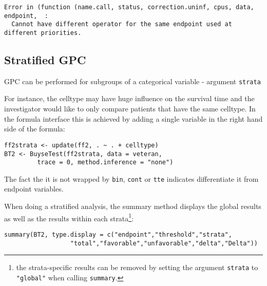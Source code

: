 \documentclass[12pt]{article}
\begin{document}
\begin{verbatim}
Error in (function (name.call, status, correction.uninf, cpus, data, endpoint,  : 
  Cannot have different operator for the same endpoint used at different priorities.
\end{verbatim}

\subsection{Stratified GPC}
\label{sec:org60483c4}

GPC can be performed for subgroups of a categorical variable \hfill -
argument \texttt{strata}

\bigskip

 For instance, the celltype may have huge influence on the survival
time and the investigator would like to only compare patients that
have the same celltype. In the formula interface this is achieved by
adding a single variable in the right hand side of the formula:
\lstset{language=r,label= ,caption= ,captionpos=b,numbers=none}
\begin{lstlisting}
ff2strata <- update(ff2, . ~ . + celltype)
BT2 <- BuyseTest(ff2strata, data = veteran, 
		 trace = 0, method.inference = "none")
\end{lstlisting}

The fact the it is not wrapped by \texttt{bin}, \texttt{cont} or \texttt{tte} indicates
differentiate it from endpoint variables. 

\clearpage

When doing a stratified analysis, the summary method displays the
global results as well as the results within each strata\footnote{the
strata-specific results can be removed by setting the argument
\texttt{strata} to \texttt{"global"} when calling \texttt{summary}.}:
\lstset{language=r,label= ,caption= ,captionpos=b,numbers=none}
\begin{lstlisting}
summary(BT2, type.display = c("endpoint","threshold","strata",
			      "total","favorable","unfavorable","delta","Delta"))
\end{lstlisting}
\end{document}
